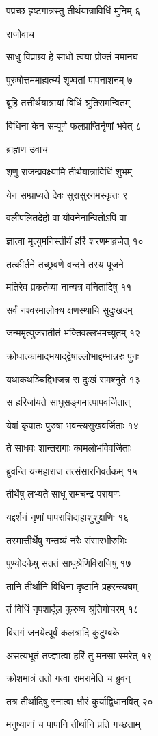 पप्रच्छ हृष्टगात्रस्तु तीर्थयात्राविधिं मुनिम् ६

राजोवाच

साधु विप्राग्र्य हे साधो त्वया प्रोक्तं ममानघ

पुरुषोत्तममाहात्म्यं शृण्वतां पापनाशनम् ७

ब्रूहि तत्तीर्थयात्रायां विधिं श्रुतिसमन्वितम्

विधिना केन सम्पूर्ण फलप्राप्तिर्नृणां भवेत् ८

ब्राह्मण उवाच

शृणु राजन्प्रवक्ष्यामि तीर्थयात्राविधिं शुभम्

येन सम्प्राप्यते देवः सुरासुरनमस्कृतः ९

वलीपलितदेहो वा यौवनेनान्वितोऽपि वा

ज्ञात्वा मृत्युमनिस्तीर्यं हरिं शरणमाव्रजेत् १०

तत्कीर्तने तच्छ्रवणे वन्दने तस्य पूजने

मतिरेव प्रकर्तव्या नान्यत्र वनितादिषु ११

सर्वं नश्वरमालोक्य क्षणस्थायि सुदुःखदम्

जन्ममृत्युजरातीतं भक्तिवल्लभमच्युतम् १२

क्रोधात्कामाद्भयाद्द्वेषाल्लोभाद्दम्भान्नरः पुनः

यथाकथञ्चिद्विभजन्न स दुःखं समश्नुते १३

स हरिर्जायते साधुसङ्गमात्पापवर्जितात्

येषां कृपातः पुरुषा भवन्त्यसुखवर्जिताः १४

ते साधवः शान्तरागाः कामलोभविवर्जिताः

ब्रुवन्ति यन्महाराज तत्संसारनिवर्तकम् १५

तीर्थेषु लभ्यते साधू रामचन्द्र परायणः

यद्दर्शनं नृणां पापराशिदाहाशुशुक्षणिः १६

तस्मात्तीर्थेषु गन्तव्यं नरैः संसारभीरुभिः

पुण्योदकेषु सततं साधुश्रेणिविराजिषु १७

तानि तीर्थानि विधिना दृष्टानि प्रहरन्त्यघम्

तं विधिं नृपशार्दूल कुरुष्व श्रुतिगोचरम् १८

विरागं जनयेत्पूर्वं कलत्रादि कुटुम्बके

असत्यभूतं तज्ज्ञात्वा हरिं तु मनसा स्मरेत् १९

क्रोशमात्रं ततो गत्वा रामरामेति च ब्रुवन्

तत्र तीर्थादिषु स्नात्वा क्षौरं कुर्याद्विधानवित् २०

मनुष्याणां च पापानि तीर्थानि प्रति गच्छताम्

